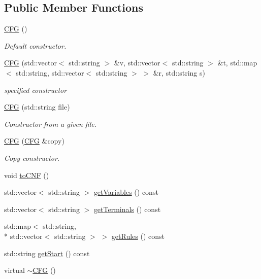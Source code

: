 \subsection*{Public Member Functions}
\begin{DoxyCompactItemize}
\item 
\hyperlink{classCFG_a6a6d74b60d6abc9b91031aaac23067ff}{C\-F\-G} ()
\begin{DoxyCompactList}\small\item\em Default constructor. \end{DoxyCompactList}\item 
\hyperlink{classCFG_ae6f918a908ebef14199ce1e6ce909196}{C\-F\-G} (std\-::vector$<$ std\-::string $>$ \&v, std\-::vector$<$ std\-::string $>$ \&t, std\-::map$<$ std\-::string, std\-::vector$<$ std\-::string $>$ $>$ \&r, std\-::string s)
\begin{DoxyCompactList}\small\item\em specified constructor \end{DoxyCompactList}\item 
\hyperlink{classCFG_a5a7524ec649377e2d8c2d8218db40b44}{C\-F\-G} (std\-::string file)
\begin{DoxyCompactList}\small\item\em Constructor from a given file. \end{DoxyCompactList}\item 
\hyperlink{classCFG_acdf5e087e7726343079e006f6dd0d43e}{C\-F\-G} (\hyperlink{classCFG}{C\-F\-G} \&copy)
\begin{DoxyCompactList}\small\item\em Copy constructor. \end{DoxyCompactList}\item 
void \hyperlink{classCFG_a4f0a00a699ba4a6247333a47b0bf9ff2}{to\-C\-N\-F} ()
\item 
std\-::vector$<$ std\-::string $>$ \hyperlink{classCFG_abe3e4a8324808575d5d0c033671b71ab}{get\-Variables} () const 
\item 
std\-::vector$<$ std\-::string $>$ \hyperlink{classCFG_a766b9baac4bd283b8b761139e75aae55}{get\-Terminals} () const 
\item 
std\-::map$<$ std\-::string, \\*
std\-::vector$<$ std\-::string $>$ $>$ \hyperlink{classCFG_aa861ae80a1391594cf2bf50cfac38ea9}{get\-Rules} () const 
\item 
std\-::string \hyperlink{classCFG_ae7e150fabee50d533159038262bc71d3}{get\-Start} () const 
\item 
virtual \hyperlink{classCFG_aaf69bdb0d01010bf6272a097ccc0c60c}{$\sim$\-C\-F\-G} ()
\end{DoxyCompactItemize}
